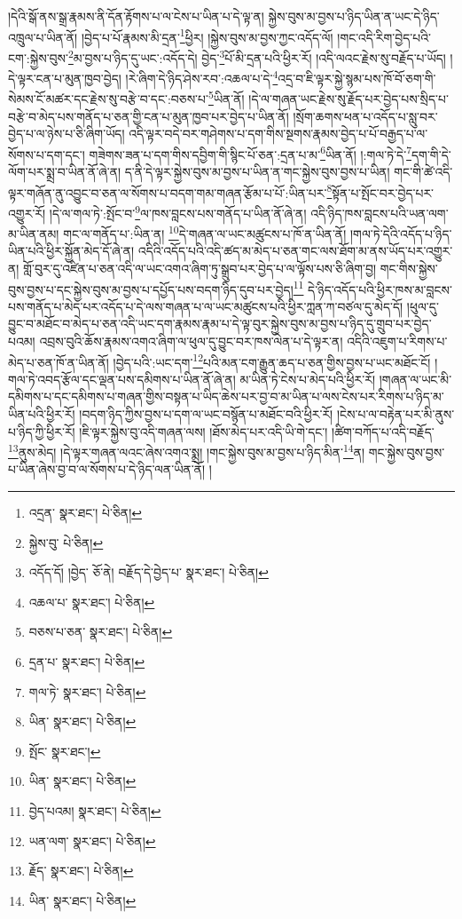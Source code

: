 །དེའི་སྒོ་ནས་སྒྲ་རྣམས་ནི་དོན་རྟོགས་པ་ལ་ངེས་པ་ཡིན་པ་དེ་ལྟ་ན། སྐྱེས་བུས་མ་བྱས་པ་ཉིད་ཡིན་ན་ཡང་དེ་ཉིད་འཁྲུལ་པ་ཡིན་ནོ། །བྱེད་པ་པོ་རྣམས་མི་དྲན་\footnote{འདྲན་  སྣར་ཐང་།  པེ་ཅིན། }ཕྱིར། །སྐྱེས་བུས་མ་བྱས་ཀྱང་འདོད་ལོ། །གང་འདི་རིག་བྱེད་པའི་ངག་:སྐྱེས་བུས་\footnote{སྐྱེས་བུ་  པེ་ཅིན། }མ་བྱས་པ་ཉིད་དུ་ཡང་:འདོད་དེ། བྱེད་\footnote{འདོད་དོ། །བྱེད་  ཅོ་ནེ། བརྗོད་དེ་བྱེད་པ་  སྣར་ཐང་།  པེ་ཅིན། }པོ་མི་དྲན་པའི་ཕྱིར་རོ། །འདི་ལའང་རྗེས་སུ་བརྗོད་པ་ཡོད། །དེ་ལྟར་ངན་པ་མུན་ཁྱབ་བྱེད། །རེ་ཞིག་དེ་ཉིད་ཤེས་རབ་:འཆལ་པ་དེ་\footnote{འཆལ་པ་  སྣར་ཐང་།  པེ་ཅིན། }འདྲ་བ་ཇི་ལྟར་སྐྱེ་སྙམ་པས་ཁོ་བོ་ཅག་གི་སེམས་ངོ་མཚར་དང་རྗེས་སུ་བརྩེ་བ་དང་:བཅས་པ་\footnote{བཅས་པ་ཅན་  སྣར་ཐང་།  པེ་ཅིན། }ཡིན་ནོ། །དེ་ལ་གཞན་ཡང་རྗེས་སུ་རྗོད་པར་བྱེད་པས་སྲིད་པ་བརྩེ་བ་མེད་པས་གནོད་པ་ཅན་གྱི་ངན་པ་མུན་ཁྱབ་པར་བྱེད་པ་ཡིན་ནོ། །སྲོག་ཆགས་ཕན་པ་འདོད་པ་སླུ་བར་བྱེད་པ་ལ་ཉེས་པ་ཅི་ཞིག་ཡོད། འདི་ལྟར་བདེ་བར་གཤེགས་པ་དག་གིས་སྔགས་རྣམས་བྱེད་པ་པོ་བརྒྱད་པ་ལ་སོགས་པ་དག་དང་། གཟེགས་ཟན་པ་དག་གིས་དབྱིག་གི་སྙིང་པོ་ཅན་:དྲན་པ་མ་\footnote{དྲན་པ་  སྣར་ཐང་།  པེ་ཅིན། }ཡིན་ནོ། །:གལ་ཏེ་དེ་\footnote{གལ་ཏེ་  སྣར་ཐང་།  པེ་ཅིན། }དག་གི་དེ་ལོག་པར་སྨྲ་བ་ཡིན་ནོ་ཞེ་ན། ད་ནི་དེ་ལྟར་སྐྱེས་བུས་མ་བྱས་པ་ཡིན་ན་གང་སྐྱེས་བུས་བྱས་པ་ཡིན། གང་གི་ཚེ་འདི་ལྟར་གཞོན་ནུ་འབྱུང་བ་ཅན་ལ་སོགས་པ་བདག་གམ་གཞན་རྩོམ་པ་པོ་:ཡིན་པར་\footnote{ཡིན་  སྣར་ཐང་།  པེ་ཅིན། }སྟོན་པ་སྤོང་བར་བྱེད་པར་འགྱུར་རོ། །དེ་ལ་གལ་ཏེ་:སྤོང་བ་\footnote{སྤོང་  སྣར་ཐང་། }ལ་ཁས་བླངས་པས་གནོད་པ་ཡིན་ནོ་ཞེ་ན། འདི་ཉིད་ཁས་བླངས་པའི་ཡན་ལག་མ་ཡིན་ནམ། གང་ལ་གནོད་པ་:ཡིན་ན། \footnote{ཡིན་  སྣར་ཐང་།  པེ་ཅིན། }དེ་གཞན་ལ་ཡང་མཚུངས་པ་ཁོ་ན་ཡིན་ནོ། །གལ་ཏེ་དེའི་འདོད་པ་ཉིད་ཡིན་པའི་ཕྱིར་སྐྱོན་མེད་དོ་ཞེ་ན། འདིའི་འདོད་པའི་འདི་ཚད་མ་མེད་པ་ཅན་གང་ལས་ཐོག་མ་ནས་ཡོད་པར་འགྱུར་ན། གློ་བུར་དུ་འཛིན་པ་ཅན་འདི་ལ་ཡང་འགའ་ཞིག་ཏུ་སྒྲུབ་པར་བྱེད་པ་ལ་ལྟོས་པས་ཅི་ཞིག་བྱ། གང་གིས་སྐྱེས་བུས་བྱས་པ་དང་སྐྱེས་བུས་མ་བྱས་པ་དཔྱོད་པས་བདག་ཉིད་དུབ་པར་བྱེད།\footnote{བྱེད་པའམ།  སྣར་ཐང་།  པེ་ཅིན། } དེ་ཉིད་འདོད་པའི་ཕྱིར་ཁས་མ་བླངས་པས་གནོད་པ་མེད་པར་འདོད་པ་དེ་ལས་གཞན་པ་ལ་ཡང་མཚུངས་པའི་ཕྱིར་ཀླན་ཀ་བཙལ་དུ་མེད་དོ། །ཕུལ་དུ་བྱུང་བ་མཐོང་བ་མེད་པ་ཅན་འདི་ཡང་དག་རྣམས་རྣམ་པ་དེ་ལྟ་བུར་སྐྱེས་བུས་མ་བྱས་པ་ཉིད་དུ་གྲུབ་པར་བྱེད་པའམ། འབྲས་བུའི་ཆོས་རྣམས་འགའ་ཞིག་ལ་ཕུལ་དུ་བྱུང་བར་ཁས་ལེན་པ་དེ་ལྟར་ན། འདིའི་འཇུག་པ་རིགས་པ་མེད་པ་ཅན་ཁོ་ན་ཡིན་ནོ། །བྱེད་པའི་:ཡང་དག་\footnote{ཡན་ལག་  སྣར་ཐང་།  པེ་ཅིན། }པའི་མན་ངག་རྒྱུན་ཆད་པ་ཅན་གྱིས་བྱས་པ་ཡང་མཐོང་ངོ། །གལ་ཏེ་འབད་རྩོལ་དང་ལྡན་པས་དམིགས་པ་ཡིན་ནོ་ཞེ་ན། མ་ཡིན་ཏེ་ངེས་པ་མེད་པའི་ཕྱིར་རོ། །གཞན་ལ་ཡང་མི་དམིགས་པ་དང་དམིགས་པ་གཞན་གྱིས་བསྟན་པ་ཡིད་ཆེས་པར་བྱ་བ་མ་ཡིན་པ་ལས་ངེས་པར་རིགས་པ་ཉིད་མ་ཡིན་པའི་ཕྱིར་རོ། །བདག་ཉིད་ཀྱིས་བྱས་པ་དག་ལ་ཡང་བསྙོན་པ་མཐོང་བའི་ཕྱིར་རོ། །ངེས་པ་ལ་བརྟེན་པར་མི་ནུས་པ་ཉིད་ཀྱི་ཕྱིར་རོ། །ཇི་ལྟར་སྐྱེས་བུ་འདི་གཞན་ལས། །ཐོས་མེད་པར་འདི་ཡི་གེ་དང་། །ཚིག་བཀོད་པ་འདི་བརྗོད་\footnote{རྗོད་  སྣར་ཐང་།  པེ་ཅིན། }ནུས་མེད། །དེ་ལྟར་གཞན་ལའང་ཞེས་འགའ་སྨྲ། །གང་སྐྱེས་བུས་མ་བྱས་པ་ཉིད་མིན་\footnote{ཡིན་  སྣར་ཐང་།  པེ་ཅིན། }ན། གང་སྐྱེས་བུས་བྱས་པ་ཡིན་ཞེས་བྱ་བ་ལ་སོགས་པ་དེ་ཉིད་ལན་ཡིན་ནོ། །
